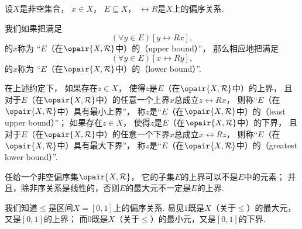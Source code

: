 \begin{definition}
设\(X\)是非空集合，
\(x \in X\)，
\(E \subseteq X\)，
\(\rel{R}\)是\(X\)上的偏序关系.

我们如果把满足\begin{equation*}
	(\forall y \in E)[y\rel{R}x],
\end{equation*}的\(x\)称为
“\(E\)（在\(\opair{X,\mathcal{R}}\)中）的（upper bound）”，
那么相应地把满足\begin{equation*}
	(\forall y \in E)[x\rel{R}y],
\end{equation*}的\(x\)称为
“\(E\)（在\(\opair{X,\mathcal{R}}\)中）的（lower bound）”.

在上述约定下，
如果存在\(z \in X\)，
使得\(z\)是\(E\)（在\(\opair{X,\mathcal{R}}\)中）的上界，
且对于\(E\)（在\(\opair{X,\mathcal{R}}\)中）的任意一个上界\(x\)总成立\(z\rel{R}x\)，
则称“\(E\)（在\(\opair{X,\mathcal{R}}\)中）具有最小上界”，
称\(z\)是“\(E\)（在\(\opair{X,\mathcal{R}}\)中）的（least upper bound）”；
如果存在\(z \in X\)，
使得\(z\)是\(E\)（在\(\opair{X,\mathcal{R}}\)中）的下界，
且对于\(E\)（在\(\opair{X,\mathcal{R}}\)中）的任意一个下界\(x\)总成立\(x\rel{R}z\)，
则称“\(E\)（在\(\opair{X,\mathcal{R}}\)中）具有最大下界”，
称\(z\)是“\(E\)（在\(\opair{X,\mathcal{R}}\)中）的（greatest lower bound）”.
\end{definition}

任给一个非空偏序集\(\opair{X,\rel{R}}\)，
它的子集\(E\)的上界可以不是\(E\)中的元素；
并且，除非序关系是线性的，否则\(E\)的最大元不一定是\(E\)的上界.

\begin{example}
我们知道\(\leq\)是区间\(X=[0,1]\)上的偏序关系.
易见\(1\)既是\(X\)（关于\(\leq\)）的最大元，又是\([0,1]\)的上界；
而\(0\)既是\(X\)（关于\(\leq\)）的最小元，又是\([0,1]\)的下界.
\end{example}

